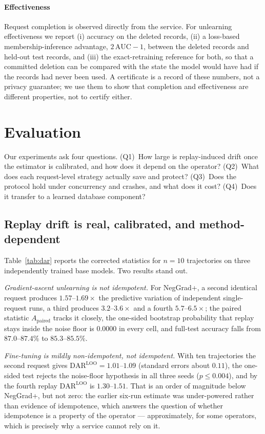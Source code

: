 \documentclass[conference]{IEEEtran}
\newcommand{\dar}{\mathrm{DAR}}
\newcommand{\DLOO}{\dar^{\mathrm{LOO}}}
\newcommand{\Apa}{A_{\mathrm{paired}}}
\begin{document}
\paragraph{Effectiveness}
Request completion is observed directly from the service.  For unlearning
effectiveness we report (i) accuracy on the deleted records, (ii) a loss-based
membership-inference advantage, $2\,\mathrm{AUC}-1$, between the deleted records and
held-out test records, and (iii) the exact-retraining reference for both, so that a
committed deletion can be compared with the state the model would have had if the
records had never been used.  A certificate is a record of these numbers, not a
privacy guarantee; we use them to show that completion and effectiveness are
different properties, not to certify either.

\section{Evaluation}
\label{sec:eval}

Our experiments ask four questions.  (Q1)~How large is replay-induced drift once the
estimator is calibrated, and how does it depend on the operator?  (Q2)~What does each
request-level strategy actually save and protect?  (Q3)~Does the protocol hold under
concurrency and crashes, and what does it cost?  (Q4)~Does it transfer to a learned
database component?

\subsection{Replay drift is real, calibrated, and method-dependent}
\label{sec:eval-drift}

Table~\ref{tab:dar} reports the corrected statistics for $n=10$ trajectories on three
independently trained base models.  Two results stand out.

\emph{Gradient-ascent unlearning is not idempotent.}  For NegGrad+, a second
identical request produces $1.57$--$1.69\times$ the predictive variation of
independent single-request runs, a third produces $3.2$--$3.6\times$ and a fourth
$5.7$--$6.5\times$; the paired statistic $\Apa$ tracks it closely, the one-sided
bootstrap probability that replay stays inside the noise floor is $0.0000$ in every
cell, and full-test accuracy falls from $87.0$--$87.4\%$ to $85.3$--$85.5\%$.

\emph{Fine-tuning is mildly non-idempotent, not idempotent.}  With ten trajectories the second
request gives $\DLOO=1.01$--$1.09$ (standard errors about $0.11$), the one-sided test rejects
the noise-floor hypothesis in all three seeds ($p\le0.004$), and by the fourth replay
$\DLOO$ is $1.30$--$1.51$.  That is an order of magnitude below NegGrad+, but not zero: the
earlier six-run estimate was under-powered rather than evidence of idempotence, which answers
the question of whether idempotence is a property of the operator --- approximately, for some
operators, which is precisely why a service cannot rely on it.
\end{document}
